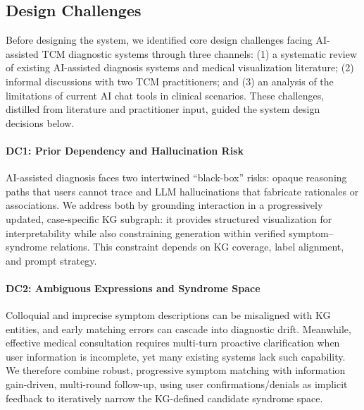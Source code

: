 
\providecommand{\JEBMMethodsBibForTools}{}

\subsection{Design Challenges}\label{sec:challenges}

Before designing the system, we identified core design challenges facing AI-assisted TCM diagnostic systems through three channels: (1) a systematic review of existing AI-assisted diagnosis systems and medical visualization literature; (2) informal discussions with two TCM practitioners; and (3) an analysis of the limitations of current AI chat tools in clinical scenarios.
These challenges, distilled from literature and practitioner input, guided the system design decisions below.

\paragraph{DC1: Prior Dependency and Hallucination Risk}
AI-assisted diagnosis faces two intertwined ``black-box'' risks: opaque reasoning paths that users cannot trace\cite{40,41} and LLM hallucinations that fabricate rationales or associations\cite{44,45}. We address both by grounding interaction in a progressively updated, case-specific KG subgraph: it provides structured visualization for interpretability\cite{24,35} while also constraining generation within verified symptom--syndrome relations\cite{25,64}. This constraint depends on KG coverage, label alignment, and prompt strategy.

\paragraph{DC2: Ambiguous Expressions and Syndrome Space}
Colloquial and imprecise symptom descriptions can be misaligned with KG entities\cite{65}, and early matching errors can cascade into diagnostic drift. Meanwhile, effective medical consultation requires multi-turn proactive clarification when user information is incomplete\cite{1,19,DocCHA2025,61}, yet many existing systems lack such capability. We therefore combine robust, progressive symptom matching with information gain-driven, multi-round follow-up\cite{11,36,12}, using user confirmations/denials as implicit feedback to iteratively narrow the KG-defined candidate syndrome space.

